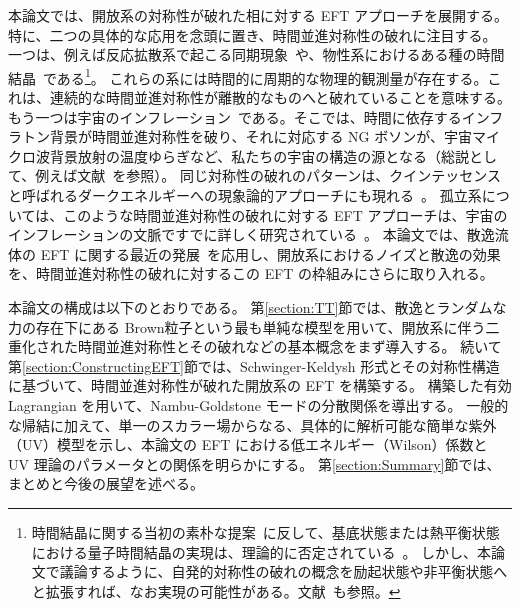 \medskip
本論文では、開放系の対称性が破れた相に対する EFT アプローチを展開する。
特に、二つの具体的な応用を念頭に置き、時間並進対称性の破れに注目する。
一つは、例えば反応拡散系で起こる同期現象~\cite{Kuramoto,MoriKuramoto}や、物性系におけるある種の時間結晶~\cite{PhysRevLett.96.230602,PhysRevLett.99.140402,sieberer2016keldysh}である\footnote{
時間結晶に関する当初の素朴な提案~\cite{Wilczek:2012jt}に反して、基底状態または熱平衡状態における量子時間結晶の実現は、理論的に否定されている~\cite{Bruno:2013mva,Watanabe:2014hea,Yamamoto:2015fxa}。
しかし、本論文で議論するように、自発的対称性の破れの概念を励起状態や非平衡状態へと拡張すれば、なお実現の可能性がある。文献~\cite{Buca:2018ccq}も参照。}。
これらの系には時間的に周期的な物理的観測量が存在する。これは、連続的な時間並進対称性が離散的なものへと破れていることを意味する。
もう一つは宇宙のインフレーション~\cite{Starobinsky:1980te,Guth:1980zm,Sato:1980yn}である。そこでは、時間に依存するインフラトン背景が時間並進対称性を破り、それに対応する NG ボソンが、宇宙マイクロ波背景放射の温度ゆらぎなど、私たちの宇宙の構造の源となる（総説として、例えば文献~\cite{Baumann:2009ds,Senatore:2016aui}を参照）。
同じ対称性の破れのパターンは、クインテッセンスと呼ばれるダークエネルギーへの現象論的アプローチにも現れる~\cite{Gubitosi:2012hu}。
孤立系については、このような時間並進対称性の破れに対する EFT アプローチは、宇宙のインフレーションの文脈ですでに詳しく研究されている~\cite{Cheung:2007st}。
本論文では、散逸流体の EFT に関する最近の発展~\cite{Crossley:2015evo,Glorioso:2017fpd}を応用し、開放系におけるノイズと散逸の効果を、時間並進対称性の破れに対するこの EFT の枠組みにさらに取り入れる。


\medskip
本論文の構成は以下のとおりである。
第\ref{section:TT}節では、散逸とランダムな力の存在下にある Brown粒子という最も単純な模型を用いて、開放系に伴う二重化された時間並進対称性とその破れなどの基本概念をまず導入する。
続いて第\ref{section:ConstructingEFT}節では、Schwinger-Keldysh 形式とその対称性構造に基づいて、時間並進対称性が破れた開放系の EFT を構築する。
構築した有効 Lagrangian を用いて、Nambu-Goldstone モードの分散関係を導出する。
一般的な帰結に加えて、単一のスカラー場からなる、具体的に解析可能な簡単な紫外（UV）模型を示し、本論文の EFT における低エネルギー（Wilson）係数と UV 理論のパラメータとの関係を明らかにする。
第\ref{section:Summary}節では、まとめと今後の展望を述べる。


\label{section:TT} 

